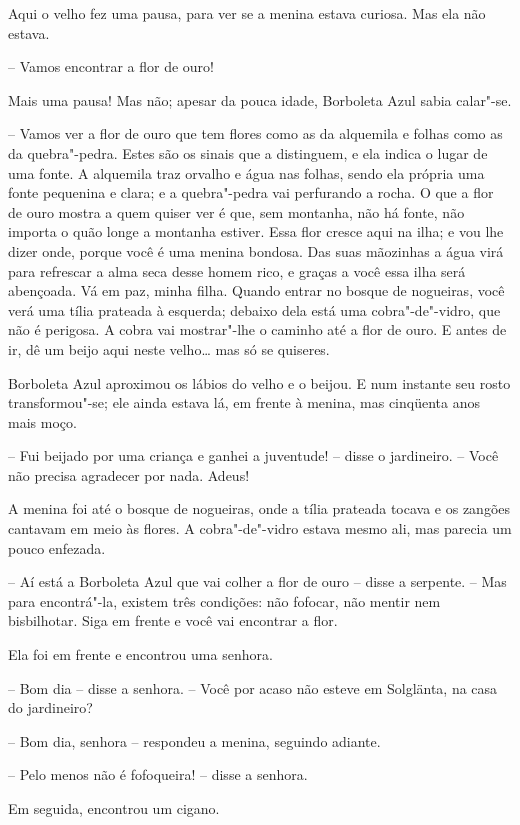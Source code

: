 Aqui o velho fez uma pausa, para ver se a menina estava curiosa. Mas ela
não estava.

-- Vamos encontrar a flor de ouro!

Mais uma pausa! Mas não; apesar da pouca idade, Borboleta Azul sabia
calar"-se.

-- Vamos ver a flor de ouro que tem flores como as da alquemila e folhas
como as da quebra"-pedra. Estes são os sinais que a distinguem, e ela
indica o lugar de uma fonte. A alquemila traz orvalho e água nas
folhas, sendo ela própria uma fonte pequenina e clara; e a
quebra"-pedra vai perfurando a rocha. O que a flor de ouro mostra a
quem quiser ver é que, sem montanha, não há fonte, não importa o quão
longe a montanha estiver. Essa flor cresce aqui na ilha; e vou lhe
dizer onde, porque você é uma menina bondosa. Das suas mãozinhas a água
virá para refrescar a alma seca desse homem rico, e graças a você essa
ilha será abençoada. Vá em paz, minha filha. Quando entrar no bosque de
nogueiras, você verá uma tília prateada à esquerda; debaixo dela está
uma cobra"-de"-vidro, que não é perigosa. A cobra vai mostrar"-lhe o
caminho até a flor de ouro. E antes de ir, dê um beijo aqui neste
velho\ldots{} mas só se quiseres. 

Borboleta Azul aproximou os lábios do velho e o beijou. E num instante
seu rosto transformou"-se; ele ainda estava lá, em frente à menina,
mas cinqüenta anos mais moço.

-- Fui beijado por uma criança e ganhei a juventude! -- disse o
jardineiro. -- Você não precisa agradecer por nada. Adeus!

A menina foi até o bosque de nogueiras, onde a tília prateada tocava e
os zangões cantavam em meio às flores. A cobra"-de"-vidro estava
mesmo ali, mas parecia um pouco enfezada.

-- Aí está a Borboleta Azul que vai colher a flor de ouro -- disse a
serpente. -- Mas para encontrá"-la, existem três condições: não
fofocar, não mentir nem bisbilhotar. Siga em frente e você vai
encontrar a flor. 

Ela foi em frente e encontrou uma senhora.

-- Bom dia -- disse a senhora. -- Você por acaso não esteve em Solglänta,
na casa do jardineiro?

-- Bom dia, senhora -- respondeu a menina, seguindo adiante.

-- Pelo menos não é fofoqueira! -- disse a senhora.

Em seguida, encontrou um cigano.

